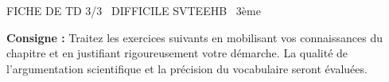 \documentclass[11pt]{article}
\begin{document}
\begin{tcolorbox}[enhanced,colback=popink,colframe=popink,arc=10pt,boxrule=0pt,left=12pt,right=12pt,top=9pt,bottom=9pt]
{\color{white}\popxbold\small FICHE DE TD 3/3 \textbullet\ DIFFICILE \hfill SVTEEHB \textbullet\ 3ème\par}
\end{tcolorbox}
\vspace{4pt}
\noindent \textbf{Consigne :} Traitez les exercices suivants en mobilisant vos connaissances du chapitre et en justifiant rigoureusement votre démarche. La qualité de l'argumentation scientifique et la précision du vocabulaire seront évaluées.
\end{document}
